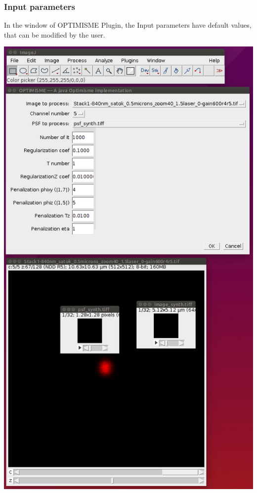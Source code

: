 \documentclass[12pt, a4paper]{scrartcl}
\begin{document}
\subsubsection{Input parameters}
In the window of OPTIMISME Plugin, the Input parameters have default values, that can be modified by the user.
\begin{center}
\includegraphics[scale=0.3]{images/plugginI.png}
\end{center}
\end{document}

